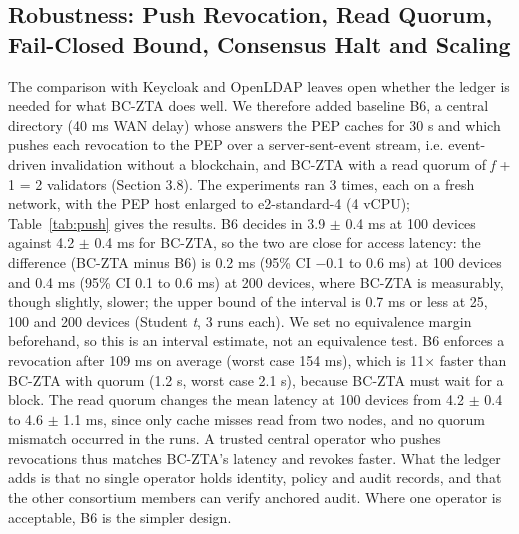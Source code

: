 \documentclass[a4paper,5p,times,twocolumn,number,sort&compress]{elsarticle}
\begin{document}
\subsection{Robustness: Push Revocation, Read Quorum, Fail-Closed Bound, Consensus Halt and Scaling}

The comparison with Keycloak and OpenLDAP leaves open whether the ledger is needed for what BC-ZTA does well. We therefore added baseline B6, a central directory (40 ms WAN delay) whose answers the PEP caches for 30 s and which pushes each revocation to the PEP over a server-sent-event stream, i.e. event-driven invalidation without a blockchain, and BC-ZTA with a read quorum of \emph{f} + 1 = 2 validators (Section 3.8). The experiments ran 3 times, each on a fresh network, with the PEP host enlarged to e2-standard-4 (4 vCPU); Table~\ref{tab:push} gives the results. B6 decides in 3.9 $\pm$ 0.4 ms at 100 devices against 4.2 $\pm$ 0.4 ms for BC-ZTA, so the two are close for access latency: the difference (BC-ZTA minus B6) is 0.2 ms (95\% CI $-$0.1 to 0.6 ms) at 100 devices and 0.4 ms (95\% CI 0.1 to 0.6 ms) at 200 devices, where BC-ZTA is measurably, though slightly, slower; the upper bound of the interval is 0.7 ms or less at 25, 100 and 200 devices (Student \emph{t}, 3 runs each). We set no equivalence margin beforehand, so this is an interval estimate, not an equivalence test. B6 enforces a revocation after 109 ms on average (worst case 154 ms), which is 11$\times$ faster than BC-ZTA with quorum (1.2 s, worst case 2.1 s), because BC-ZTA must wait for a block. The read quorum changes the mean latency at 100 devices from 4.2 $\pm$ 0.4 to 4.6 $\pm$ 1.1 ms, since only cache misses read from two nodes, and no quorum mismatch occurred in the runs. A trusted central operator who pushes revocations thus matches BC-ZTA's latency and revokes faster. What the ledger adds is that no single operator holds identity, policy and audit records, and that the other consortium members can verify anchored audit. Where one operator is acceptable, B6 is the simpler design.
\end{document}
